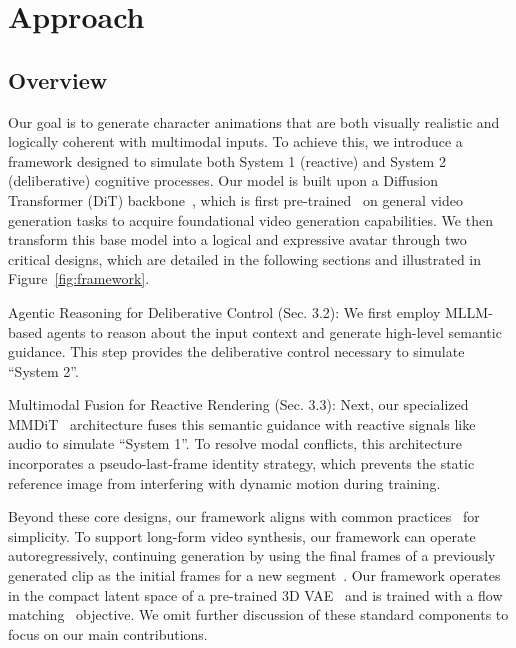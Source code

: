 \section{Approach}\label{sec:method}

\subsection{Overview}

Our goal is to generate character animations that are both visually realistic and logically coherent with multimodal inputs. To achieve this, we introduce a framework designed to simulate both System 1 (reactive) and System 2 (deliberative) cognitive processes. Our model is built upon a Diffusion Transformer (DiT) backbone~\cite{seawead2025seaweed,gao2025seedance,esser2024sd3,dit}, which is first pre-trained~\cite{gao2025seedance} on general video generation tasks to acquire foundational video generation capabilities. We then transform this base model into a logical and expressive avatar through two critical designs, which are detailed in the following sections and illustrated in Figure~\ref{fig:framework}.

\par
Agentic Reasoning for Deliberative Control (Sec. 3.2): We first employ MLLM-based agents to reason about the input context and generate high-level semantic guidance. This step provides the deliberative control necessary to simulate ``System 2''. 

Multimodal Fusion for Reactive Rendering (Sec. 3.3): Next, our specialized MMDiT~\cite{esser2024sd3} architecture fuses this semantic guidance with reactive signals like audio  to simulate ``System 1''. To resolve modal conflicts, this architecture incorporates a pseudo-last-frame identity strategy, which prevents the static reference image from interfering with dynamic motion during training. 
\par
Beyond these core designs, our framework aligns with common practices~\cite{lin2025omnihuman,gan2025omniavatar,kong2025multitalk} for simplicity. To support long-form video synthesis, our framework can operate autoregressively, continuing generation by using the final frames of a previously generated clip as the initial frames for a new segment~\cite{stypulkowski2024diffused}. Our framework operates in the compact latent space of a pre-trained 3D VAE~\cite{yu20233DVAE} and is trained with a flow matching~\cite{liu2022reflow} objective. We omit further discussion of these standard components to focus on our main contributions.

